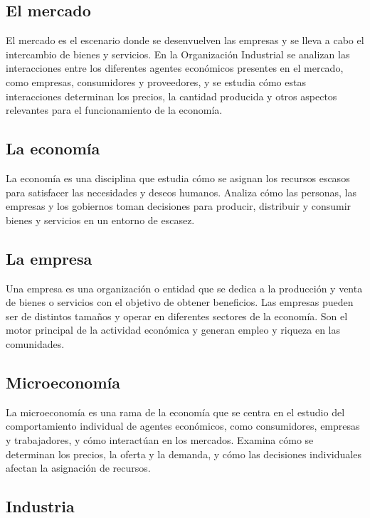 \documentclass[
  doc,
  floatsintext,
  longtable,
  a4paper,
  nolmodern,
  notxfonts,
  notimes,
  colorlinks=true,linkcolor=blue,citecolor=blue,urlcolor=blue]{apa7}
\begin{document}
\subsection{El mercado}\label{el-mercado}

El mercado es el escenario donde se desenvuelven las empresas y se lleva
a cabo el intercambio de bienes y servicios. En la Organización
Industrial se analizan las interacciones entre los diferentes agentes
económicos presentes en el mercado, como empresas, consumidores y
proveedores, y se estudia cómo estas interacciones determinan los
precios, la cantidad producida y otros aspectos relevantes para el
funcionamiento de la economía.

\subsection{La economía}\label{la-economuxeda}

La economía es una disciplina que estudia cómo se asignan los recursos
escasos para satisfacer las necesidades y deseos humanos. Analiza cómo
las personas, las empresas y los gobiernos toman decisiones para
producir, distribuir y consumir bienes y servicios en un entorno de
escasez.

\subsection{La empresa}\label{la-empresa}

Una empresa es una organización o entidad que se dedica a la producción
y venta de bienes o servicios con el objetivo de obtener beneficios. Las
empresas pueden ser de distintos tamaños y operar en diferentes sectores
de la economía. Son el motor principal de la actividad económica y
generan empleo y riqueza en las comunidades.

\subsection{Microeconomía}\label{microeconomuxeda}

La microeconomía es una rama de la economía que se centra en el estudio
del comportamiento individual de agentes económicos, como consumidores,
empresas y trabajadores, y cómo interactúan en los mercados. Examina
cómo se determinan los precios, la oferta y la demanda, y cómo las
decisiones individuales afectan la asignación de recursos.

\subsection{Industria}\label{industria}
\end{document}
